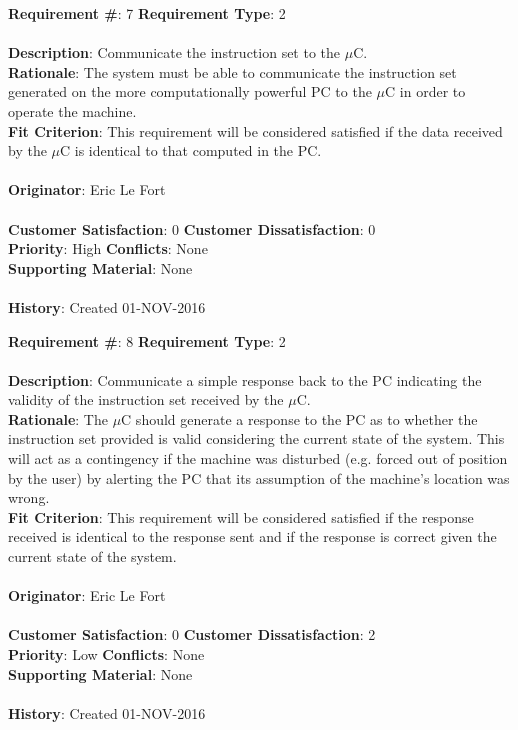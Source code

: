 \documentclass[titlepage]{article}
\begin{document}
\begin{framed}
	\noindent\textbf{Requirement \#}: 7 \hfill \textbf{Requirement Type}: 2 \hfill\\\\
	\noindent\textbf{Description}: Communicate the instruction set to the $\mu$C.\\
	\textbf{Rationale}: The system must be able to communicate the instruction set generated on the more computationally powerful PC to the $\mu$C in order to operate the machine.\\
	\textbf{Fit Criterion}: This requirement will be considered satisfied if the data received by the $\mu$C is identical to that computed in the PC.\\\\
	\textbf{Originator}: Eric Le Fort\\\\
	\noindent\textbf{Customer Satisfaction}: 0 \hfill 	\textbf{Customer Dissatisfaction}: 0 \hfill\\
	\textbf{Priority}: High \hfill \textbf{Conflicts}: None \hfill\\
	\textbf{Supporting Material}: None\\\\
	\noindent\textbf{History}: Created 01-NOV-2016
\end{framed}

\begin{framed}
	\noindent\textbf{Requirement \#}: 8 \hfill \textbf{Requirement Type}: 2 \hfill\\\\
	\noindent\textbf{Description}: Communicate a simple response back to the PC indicating the validity of the instruction set received by the $\mu$C.\\
	\textbf{Rationale}: The $\mu$C should generate a response to the PC as to whether the instruction set provided is valid considering the current state of the system. This will act as a contingency if the machine was disturbed (e.g. forced out of position by the user) by alerting the PC that its assumption of the machine's location was wrong.\\
	\textbf{Fit Criterion}: This requirement will be considered satisfied if the response received is identical to the response sent and if the response is correct given the current state of the system.\\\\
	\textbf{Originator}: Eric Le Fort\\\\
	\noindent\textbf{Customer Satisfaction}: 0 \hfill 	\textbf{Customer Dissatisfaction}: 2 \hfill\\
	\textbf{Priority}: Low \hfill \textbf{Conflicts}: None \hfill\\
	\textbf{Supporting Material}: None\\\\
	\noindent\textbf{History}: Created 01-NOV-2016
\end{framed}
\end{document}

